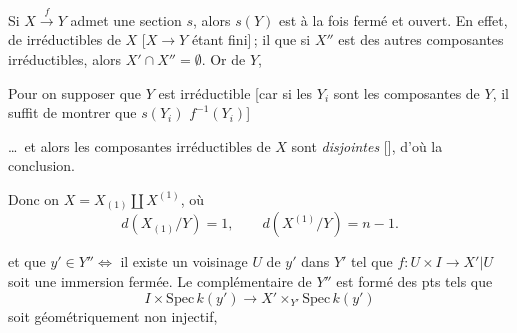 \documentclass[11pt,a4paper]{article}
\begin{document}


Si $X \xrightarrow{f} Y$ admet une section $s$, \struck{\ill{}} alors $s(Y)$
est à la fois \struck{\ill{}} fermé et ouvert. En effet,
  de
 irréductibles de $X$ [$X \to Y$ étant fini]\,; il
  que si $X''$ est  \ill{}
 des autres composantes irréductibles, alors
$X' \cap X'' = \emptyset$. Or \struck{\ill{} \ill{}}
 \ill{} de $Y$, \ill{}
 


Pour  on   supposer
que $Y$ est irréductible
[car si les $Y_i$ sont les composantes de $Y$, il suffit de montrer que
$s(Y_i)$  \ill{}  $f^{-1}(Y_i)$]



…\ et alors les composantes irréductibles de $X$ sont
\emph{disjointes} [], \struck{\ill{}} d'où
la conclusion.

Donc on  $X = X_{(1)} \amalg X^{(1)}$, où
\[
  d(X_{(1)}/Y) = 1, \qquad d(X^{(1)}/Y) = n - 1 .
\]



et que $y' \in Y'' \Leftrightarrow$ il existe un voisinage $U$ de $y'$ dans
$Y'$ tel que $f : U \times I \to X'|U$ soit une \struck{\ill{}} immersion
fermée. Le complémentaire  de $Y''$ est formé des pts tels que
\[
  I \times \mathrm{Spec}\,k(y') \to X' \times_{Y'} \mathrm{Spec}\,k(y')
\]
soit géométriquement non injectif,
\end{document}
